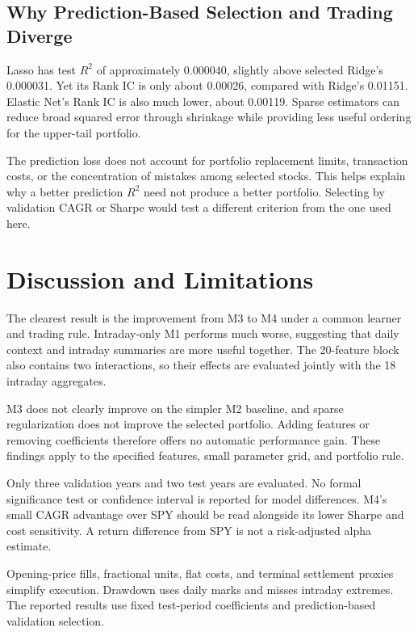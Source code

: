 \documentclass[11pt,a4paper]{article}
\newcommand{\tbl}[3]{\begin{table}[htbp]\centering\small
\caption{#2}\label{#3}#1\end{table}}
\begin{document}
\subsection{Why Prediction-Based Selection and Trading Diverge}
\tbl{\AblationPredictionTable}{Test prediction and turnover diagnostics for
selected regularizers. $R^2$ is dimensionless; turnover is percent.}{tab:ablationprediction}
Lasso has test $R^2$ of approximately 0.000040, slightly above selected
Ridge's 0.000031. Yet its Rank IC is only about 0.00026, compared with
Ridge's 0.01151. Elastic Net's Rank IC is also much lower, about 0.00119.
Sparse estimators can reduce broad squared error through shrinkage while
providing less useful ordering for the upper-tail portfolio.

The prediction loss does not account for portfolio replacement limits,
transaction costs, or the concentration of mistakes among selected stocks.
This helps explain why a better prediction $R^2$ need not produce a better
portfolio. Selecting by validation CAGR or Sharpe would test a different
criterion from the one used here.

\section{Discussion and Limitations}
\label{sec:limits}
The clearest result is the improvement from M3 to M4 under a common learner
and trading rule. Intraday-only M1 performs much worse, suggesting that daily
context and intraday summaries are more useful together. The 20-feature block
also contains two interactions, so their effects are evaluated jointly with
the 18 intraday aggregates.

M3 does not clearly improve on the simpler M2 baseline, and sparse
regularization does not improve the selected portfolio. Adding features or
removing coefficients therefore offers no automatic performance gain.
These findings apply to the specified features, small parameter grid, and
portfolio rule.

Only three validation years and two test years are evaluated. No formal
significance test or confidence interval is reported for model differences.
M4's small CAGR advantage over SPY should be read alongside its lower Sharpe
and cost sensitivity. A return difference from SPY is not a risk-adjusted
alpha estimate.

Opening-price fills, fractional units, flat costs, and terminal settlement
proxies simplify execution. Drawdown uses daily marks and misses intraday
extremes. The reported results use fixed test-period coefficients and
prediction-based validation selection.
\end{document}
